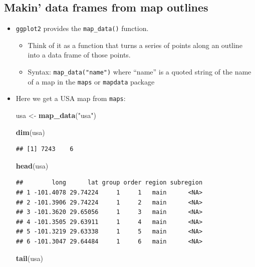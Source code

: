 \documentclass[]{book}
\newenvironment{Shaded}{\begin{snugshade}}{\end{snugshade}}
\newcommand{\KeywordTok}[1]{\textcolor[rgb]{0.13,0.29,0.53}{\textbf{{#1}}}}
\newcommand{\StringTok}[1]{\textcolor[rgb]{0.31,0.60,0.02}{{#1}}}
\newcommand{\NormalTok}[1]{{#1}}
\providecommand{\tightlist}{%
  \setlength{\itemsep}{0pt}\setlength{\parskip}{0pt}}
\theoremstyle{definition}
\theoremstyle{definition}
\theoremstyle{remark}
\begin{document}
\subsection{Makin' data frames from map
outlines}\label{makin-data-frames-from-map-outlines}

\begin{itemize}
\item
  \texttt{ggplot2} provides the \texttt{map\_data()} function.

  \begin{itemize}
  \tightlist
  \item
    Think of it as a function that turns a series of points along an
    outline into a data frame of those points.
  \item
    Syntax: \texttt{map\_data("name")} where ``name'' is a quoted string
    of the name of a map in the \texttt{maps} or \texttt{mapdata}
    package
  \end{itemize}
\item
  Here we get a USA map from \texttt{maps}:

\begin{Shaded}
\begin{Highlighting}[]
\NormalTok{usa <-}\StringTok{ }\KeywordTok{map_data}\NormalTok{(}\StringTok{"usa"}\NormalTok{)}

\KeywordTok{dim}\NormalTok{(usa)}
\end{Highlighting}
\end{Shaded}

\begin{verbatim}
## [1] 7243    6
\end{verbatim}

\begin{Shaded}
\begin{Highlighting}[]
\KeywordTok{head}\NormalTok{(usa)}
\end{Highlighting}
\end{Shaded}

\begin{verbatim}
##        long      lat group order region subregion
## 1 -101.4078 29.74224     1     1   main      <NA>
## 2 -101.3906 29.74224     1     2   main      <NA>
## 3 -101.3620 29.65056     1     3   main      <NA>
## 4 -101.3505 29.63911     1     4   main      <NA>
## 5 -101.3219 29.63338     1     5   main      <NA>
## 6 -101.3047 29.64484     1     6   main      <NA>
\end{verbatim}

\begin{Shaded}
\begin{Highlighting}[]
\KeywordTok{tail}\NormalTok{(usa)}
\end{Highlighting}
\end{Shaded}


\end{itemize}
\end{document}
